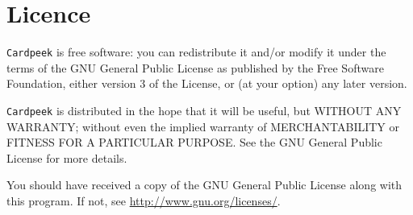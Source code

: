 \documentclass[11pt]{report}
\begin{document}
\chapter{Licence \label{chapter:licence}}

\texttt{Cardpeek} is free software: you can redistribute it and/or modify
it under the terms of the GNU General Public License as published by
the Free Software Foundation, either version 3 of the License, or
(at your option) any later version.

\texttt{Cardpeek} is distributed in the hope that it will be useful,
but WITHOUT ANY WARRANTY; without even the implied warranty of
MERCHANTABILITY or FITNESS FOR A PARTICULAR PURPOSE.  See the
GNU General Public License for more details.

You should have received a copy of the GNU General Public License
along with this program.  If not, see \url{http://www.gnu.org/licenses/}.
\end{document}
